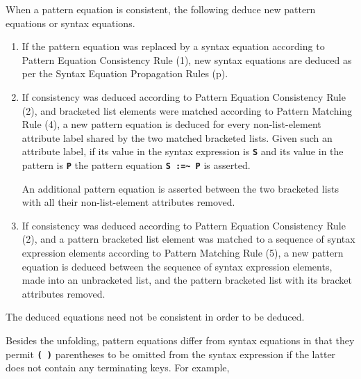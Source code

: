 \documentclass[12pt]{article}
\newcommand{\TT}[1]{{\tt \bfseries #1}}
\newcommand{\ikey}[2]{{\bf \em #1}\index{#2}}
\newcommand{\pagref}[1]{p\pageref{#1}}
\newcommand{\TILDE}{\textasciitilde}
\newenvironment{indpar}[1][0.3in]%
	{\begin{list}{}%
		     {\setlength{\itemsep}{0in}%
		      \setlength{\topsep}{0in}%
		      \setlength{\parsep}{1ex}%
		      \setlength{\labelwidth}{#1}%
		      \setlength{\leftmargin}{#1}%
		      \addtolength{\leftmargin}{\labelsep}}%
	 \item}%
	{\end{list}}
\begin{document}
\begin{indpar}
\begin{list}{}{}
\item[\ikey{Pattern Equation Propagation Rules}%
           {propagation rules!pattern equation}:]%
	   \label{PATTERN-EQUATION-PROPAGATION-RULES}
When a pattern equation is consistent, the following
deduce new pattern equations or syntax equations.

\begin{enumerate}

\item
If the pattern equation was replaced by a syntax equation according to
Pattern Equation Consistency Rule (1), new syntax equations are deduced
as per the Syntax Equation Propagation Rules
(\pagref{SYNTAX-EQUATION-PROPAGATION-RULES}).

\item
If consistency was deduced according to Pattern Equation Consistency Rule (2),
and bracketed list elements were matched according to Pattern Matching Rule (4),
a new pattern equation is deduced for every non-list-element
attribute label shared by the two matched bracketed lists.
Given such an attribute label, if its value in the syntax expression is
\TT{S} and its value in the pattern is \TT{P} the pattern equation
\TT{S :=\TILDE{} P} is asserted.

\medskip

An additional pattern equation is asserted between the two bracketed lists
with all their non-list-element attributes removed.


\item
If consistency was deduced according to Pattern Equation Consistency Rule (2),
and a pattern bracketed list element was matched to a sequence of
syntax expression elements according to Pattern Matching Rule (5),
a new pattern equation is deduced between the sequence of syntax expression
elements, made into an unbracketed list, and the pattern bracketed list
with its bracket attributes removed.

\end{enumerate}

The deduced equations need not be consistent in order to be deduced.
\end{list}
\end{indpar}

Besides the unfolding, pattern equations differ from syntax equations
in that they permit \TT{(~)} parentheses to be omitted from the
syntax expression if the latter does not contain any terminating keys.
For example,
\end{document}
